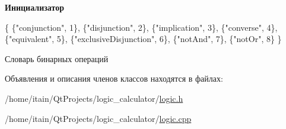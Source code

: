 {\bfseries Инициализатор}
\begin{DoxyCode}
\{
        \{\textcolor{stringliteral}{"conjunction"}, 1\},
        \{\textcolor{stringliteral}{"disjunction"}, 2\},
        \{\textcolor{stringliteral}{"implication"}, 3\},
        \{\textcolor{stringliteral}{"converse"}, 4\},
        \{\textcolor{stringliteral}{"equivalent"}, 5\},
        \{\textcolor{stringliteral}{"exclusiveDisjunction"}, 6\},
        \{\textcolor{stringliteral}{"notAnd"}, 7\},
        \{\textcolor{stringliteral}{"notOr"}, 8\}
    \}
\end{DoxyCode}


Словарь бинарных операций 



Объявления и описания членов классов находятся в файлах\+:\begin{DoxyCompactItemize}
\item 
/home/itain/\+Qt\+Projects/logic\+\_\+calculator/\hyperlink{logic_8h}{logic.\+h}\item 
/home/itain/\+Qt\+Projects/logic\+\_\+calculator/\hyperlink{logic_8cpp}{logic.\+cpp}\end{DoxyCompactItemize}
